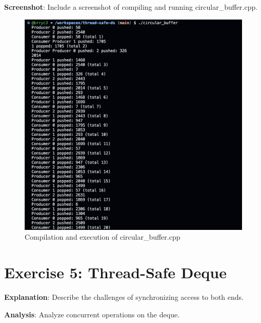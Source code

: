 \textbf{Screenshot}: Include a screenshot of compiling and running circular_buffer.cpp.
\begin{figure}[h]
    \centering
    \includegraphics[width=\textwidth]{3_screenshot.png}
    \caption{Compilation and execution of circular_buffer.cpp}
\end{figure}

\section{Exercise 5: Thread-Safe Deque}


\textbf{Explanation}: Describe the challenges of synchronizing access to both ends.

\textbf{Analysis}: Analyze concurrent operations on the deque.

